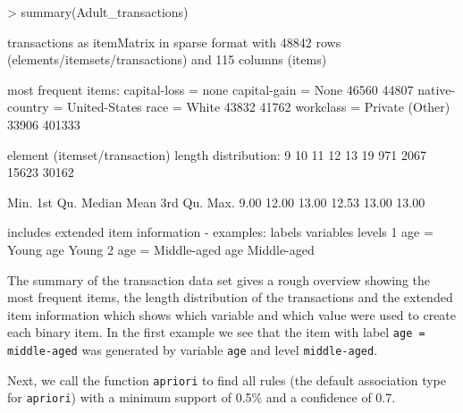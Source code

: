 \documentclass[10pt,a4paper]{article}
\newcommand{\code}[1]{\texttt{#1}}
\begin{document}
\begin{Schunk}
\begin{Sinput}
> summary(Adult_transactions)
\end{Sinput}
\begin{Soutput}
transactions as itemMatrix in sparse format with
 48842 rows (elements/itemsets/transactions) and
 115 columns (items)

most frequent items:
           capital-loss = none            capital-gain = None 
                         46560                          44807 
native-country = United-States                   race = White 
                         43832                          41762 
           workclass = Private                        (Other) 
                         33906                         401333 

element (itemset/transaction) length distribution:
    9    10    11    12    13 
   19   971  2067 15623 30162 

   Min. 1st Qu.  Median    Mean 3rd Qu.    Max. 
   9.00   12.00   13.00   12.53   13.00   13.00 

includes extended item information - examples:
             labels variables      levels
1       age = Young       age       Young
2 age = Middle-aged       age Middle-aged
\end{Soutput}
\end{Schunk}

The summary of the transaction data set gives a rough overview showing
the most frequent items, the length distribution of the transactions and
the extended item information which shows which variable and which value
were used to create each binary item. In the first example we see that
the item with label \texttt{age = middle-aged} was generated by variable
\texttt{age} and level \texttt{middle-aged}.  

Next, we call the function
\code{apriori} to find all rules (the default association type for
\code{apriori}) with a minimum support of 0.5\% and a confidence of 0.7.
\end{document}
